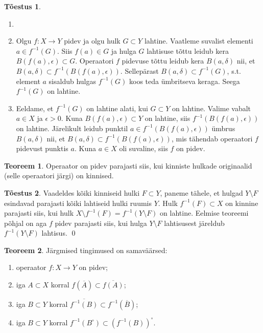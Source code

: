\documentclass{article}[12pt]
\theoremstyle{definition}
\theoremstyle{definition}
\newtheorem{theorem}{Teoreem}[section]
\theoremstyle{definition}
\theoremstyle{break}
\newtheorem*{toestus}{Tõestus}
\begin{document}
\begin{toestus}
	\begin{enumerate}
		\item[]
		\item Olgu $f:X\rightarrow Y$ pidev ja olgu hulk $G\subset Y$ lahtine. 
		Vaatleme suvalist elementi $a\in f^{-1}(G)$.
		Siis $f(a)\in G$ ja hulga $G$ lahtisuse tõttu leidub kera $B(f(a),\epsilon)\subset G$.
		Operaatori $f$ pidevuse tõttu leidub kera $B(a,\delta)$ nii, et $B(a,\delta)\subset f^{-1}(B(f(a), \epsilon))$.
		Sellepärast $B(a,\delta)\subset f^{-1}(G)$, s.t. element $a$ sisaldub hulgas $f^{-1}(G)$ koos teda ümbritseva keraga.
		Seega $f^{-1}(G)$ on lahtine.
		\item Eeldame, et $f^{-1}(G)$ on lahtine alati, kui $G\subset Y$ on lahtine.
		Valime vabalt $a\in X$ ja $\epsilon > 0$.
		Kuna $B(f(a), \epsilon)\subset Y$ on lahtine, siis $f^{-1}(B(f(a), \epsilon))$ on lahtine.
		Järelikult leidub punktil $a\in f^{-1}(B(f(a), \epsilon))$ ümbrus $B(a,\delta)$ nii, et $B(a,\delta)\subset f^{-1}(B(f(a), \epsilon))$, mis tähendab operaatori $f$ pidevust punktis $a$. Kuna $a\in X$ oli suvaline, siis $f$ on pidev.
	\end{enumerate}
\end{toestus}

\begin{theorem}
	Operaator on pidev parajasti siis, kui kinniste hulkade originaalid (selle operaatori järgi) on kinnised.
\end{theorem}

\begin{toestus}
	Vaadeldes kõiki kinniseid hulki $F\subset Y$, paneme tähele, et hulgad $Y\setminus F$ esindavad parajasti kõiki lahtiseid hulki ruumis $Y$. 
	Hulk $f^{-1}(F)\subset X$ on kinnine parajasti siis, kui hulk $X\setminus f^{-1}(F) = f^{-1}(Y\setminus F)$ on lahtine.
	Eelmise teoreemi põhjal on aga $f$ pidev parajasti siis, kui hulga $Y\setminus F$ lahtisusest järeldub $f^{-1}(Y\setminus F)$ lahtisus.
	\qed
\end{toestus}

\begin{theorem}
	Järgmised tingimused on samaväärsed:
	\begin{enumerate}
		\item operaator $f:X\rightarrow Y$ on pidev;
		\item iga $A\subset X$ korral $f(\overline{A})\subset \overline{f(A)}$;
		\item iga $B\subset Y$ korral $\overline{f^{-1}(B)}\subset f^{-1}(\overline{B})$;
		\item iga $B\subset Y$ korral $f^{-1}(B^\circ)\subset (f^{-1}(B))^\circ$.
	\end{enumerate}
\end{theorem}
\end{document}
